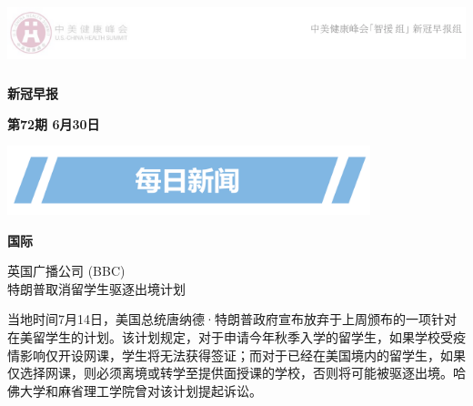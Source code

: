 \documentclass[]{article}
\author{}
\date{\vspace{-2.5em}}
\begin{document}
\fontsize{22}{22}
\selectfont
\vspace{-10truemm}

\newcommand{\resheading}[1]{%
  \noindent\fcolorbox{lavenderblush}{lavenderblush}{\makebox[\dimexpr\textwidth-2\fboxsep-2\fboxrule][c]{\textbf{~#1}}}%
}

\begin{center}
\includegraphics[height=2cm]{./input/logo2.png} 
\end{center}

\begin{center}
\fontsize{45}{45}
\textcolor{glaucous}{\textbf{新冠早报}}
\end{center}

\begin{center}
\fontsize{22}{22}
{\textcolor{glaucous}{\textbf{第72期 \space 6月30日}}}
\end{center}

\vspace{2mm}
\begin{center}
\includegraphics[height=2cm]{./input/title1.png} 
\end{center}

\vspace{-5mm}

\begin{huge}{\textcolor{glaucous}{\textbf{国际}}}\end{huge}

\vspace{-3mm}

\begin{center}
\textcolor{glaucous}{英国广播公司 (BBC)}\\特朗普取消留学生驱逐出境计划
\end{center}

当地时间7月14日，美国总统唐纳德·特朗普政府宣布放弃于上周颁布的一项针对在美留学生的计划。该计划规定，对于申请今年秋季入学的留学生，如果学校受疫情影响仅开设网课，学生将无法获得签证；而对于已经在美国境内的留学生，如果仅选择网课，则必须离境或转学至提供面授课的学校，否则将可能被驱逐出境。哈佛大学和麻省理工学院曾对该计划提起诉讼。
\end{document}
